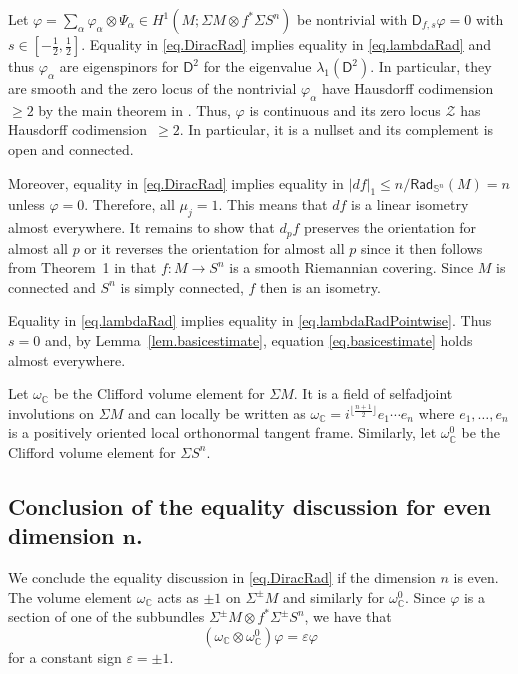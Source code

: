 \documentclass[11pt,reqno]{amsart}
\newcommand{\RadSn}{\mathsf{Rad}_{\Sn}}
\newcommand{\ZZ}{\mathscr{Z}}
\newcommand{\Sn}{\mathbb{S}^n}
\newcommand{\C}{\mathbb{C}}
\newcommand{\D}{\mathsf{D}}
\newcommand{\eps}{\varepsilon}
\renewcommand{\phi}{\varphi}
\newcommand{\<}{\langle}
\renewcommand{\>}{\rangle}
\theoremstyle{definition}
\begin{document}
Let $\phi=\sum_\alpha \phi_\alpha\otimes \Psi_\alpha\in H^1(M;\Sigma M\otimes f^*\Sigma S^n)$ be nontrivial with $\D_{f,s}\phi=0$ with $s\in[-\frac12,\frac12]$.
Equality in \eqref{eq.DiracRad} implies equality in \eqref{eq.lambdaRad} and thus $\phi_\alpha$ are eigenspinors for $\D^2$ for the eigenvalue $\lambda_1(\D^2)$.
In particular, they are smooth and the zero locus of the nontrivial $\phi_\alpha$ have Hausdorff codimension $\ge2$ by the main theorem in \cite{B-Nodal}.
Thus, $\phi$ is continuous and its zero locus $\ZZ$ has Hausdorff codimension~$\ge2$.
In particular, it is a nullset and its complement is open and connected.

Moreover, equality in \eqref{eq.DiracRad} implies equality in $|df|_1\le n/\RadSn(M)=n$ unless $\phi=0$.
Therefore, all $\mu_j=1$.
This means that $df$ is a linear isometry almost everywhere.
It remains to show that $d_pf$ preserves the orientation for almost all $p$ or it reverses the orientation for almost all $p$ since it then follows from Theorem~1 in \cite{KMS} that $f\colon M\to S^n$ is a smooth Riemannian covering.
Since $M$ is connected and $S^n$ is simply connected, $f$ then is an isometry.

Equality in \eqref{eq.lambdaRad} implies equality in \eqref{eq.lambdaRadPointwise}.
Thus $s=0$ and, by Lemma~\ref{lem.basicestimate}, equation \eqref{eq.basicestimate} holds almost everywhere.

Let $\omega_\C$ be the Clifford volume element for $\Sigma M$.
It is a field of selfadjoint involutions on $\Sigma M$ and can locally be written as $\omega_\C = i^{\lfloor \frac{n+1}{2}\rfloor}e_1\cdots e_n$ where $e_1,\dots,e_n$ is a positively oriented local orthonormal tangent frame.
Similarly, let $\omega_\C^0$ be the Clifford volume element for $\Sigma S^n$.

\subsection{\texorpdfstring{Conclusion of the equality discussion for even dimension $\boldsymbol{n}$.}{Conclusion of the equality discussion for even dimension n}}
\label{subsec.eqneven}
We conclude the equality discussion in \eqref{eq.DiracRad} if the dimension $n$ is even.
The volume element $\omega_\C$ acts as $\pm 1$ on $\Sigma^\pm M$ and similarly for $\omega_\C^0$.
Since $\phi$ is a section of one of the subbundles $\Sigma^\pm M\otimes f^*\Sigma^\pm S^n$, we have that 
\begin{equation}
(\omega_\C\otimes \omega_\C^0)\phi=\eps \phi
\label{eq.evenn.phi1}
\end{equation}
for a constant sign $\eps=\pm 1$.
\end{document}

